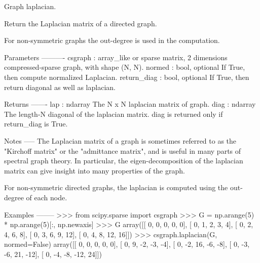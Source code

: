 Graph laplacian. 

\begin{DoxyVerb}Return the Laplacian matrix of a directed graph.

For non-symmetric graphs the out-degree is used in the computation.

Parameters
----------
csgraph : array_like or sparse matrix, 2 dimensions
    compressed-sparse graph, with shape (N, N).
normed : bool, optional
    If True, then compute normalized Laplacian.
return_diag : bool, optional
    If True, then return diagonal as well as laplacian.

Returns
-------
lap : ndarray
    The N x N laplacian matrix of graph.
diag : ndarray
    The length-N diagonal of the laplacian matrix.
    diag is returned only if return_diag is True.

Notes
-----
The Laplacian matrix of a graph is sometimes referred to as the
"Kirchoff matrix" or the "admittance matrix", and is useful in many
parts of spectral graph theory.  In particular, the eigen-decomposition
of the laplacian matrix can give insight into many properties of the graph.

For non-symmetric directed graphs, the laplacian is computed using the
out-degree of each node.

Examples
--------
>>> from scipy.sparse import csgraph
>>> G = np.arange(5) * np.arange(5)[:, np.newaxis]
>>> G
array([[ 0,  0,  0,  0,  0],
       [ 0,  1,  2,  3,  4],
       [ 0,  2,  4,  6,  8],
       [ 0,  3,  6,  9, 12],
       [ 0,  4,  8, 12, 16]])
>>> csgraph.laplacian(G, normed=False)
array([[  0,   0,   0,   0,   0],
       [  0,   9,  -2,  -3,  -4],
       [  0,  -2,  16,  -6,  -8],
       [  0,  -3,  -6,  21, -12],
       [  0,  -4,  -8, -12,  24]])
\end{DoxyVerb}
 